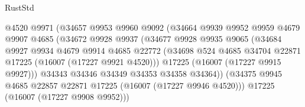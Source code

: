 \begin{lexlean}{RustStd}
\begin{coremodule}
                                    @4520
                                    @9971
                                    (@34657
                                      @9953
                                      @9960
                                      @9092
                                      (@34664
                                        @9939
                                        @9952
                                        @9959
                                        @4679
                                        @9907
                                        @4685
                                        (@34672
                                          @9928
                                          @9937
                                          (@34677
                                            @9928
                                            @9935
                                            @9065
                                            (@34684
                                              @9927
                                              @9934
                                              @4679
                                              @9914
                                              @4685
                                              @22772
                                              (@34698
                                                @524
                                                @4685
                                                @34704
                                                @22871
                                                @17225
                                                (@16007 (@17227 @9921 @4520)))
                                              @17225
                                              (@16007 (@17227 @9915 @9927)))
                                            @34343
                                            @34346
                                            @34349
                                            @34353
                                            @34358
                                            @34364))
                                        (@34375
                                          @9945
                                          @4685
                                          @22857
                                          @22871
                                          @17225
                                          (@16007 (@17227 @9946 @4520)))
                                        @17225
                                        (@16007 (@17227 @9908 @9952)))

\end{coremodule}
\end{lexlean}
